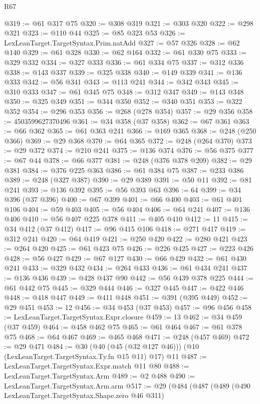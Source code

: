 \begin{lexlean}{R67}
\begin{coremodule}
@319 := @61 @317 @75
@320 := @308 @319
@321 := @303 @320
@322 := @298 @321
@323 := @110 @44
@325 := @85 @323 @53
@326 := LexLeanTarget.TargetSyntax.Prim.natAdd
@327 := @57 @326
@328 := @62 @140
@329 := @61 @328
@330 := @62 @164
@332 := @61 @330 @75
@333 := @329 @332
@334 := @327 @333
@336 := @61 @334 @75
@337 := @312 @336
@338 := @143 @337
@339 := @325 @338
@340 := @149 @339
@341 := @136 @333
@342 := @56 @341
@343 := @113 @241
@344 := @342 @343
@345 := @310 @333
@347 := @61 @345 @75
@348 := @312 @347
@349 := @143 @348
@350 := @325 @349
@351 := @344 @350
@352 := @340 @351
@353 := @322 @352
@354 := @296 @353
@356 := @268 (@278 @354)
@357 := @29 @356
@358 := 4503599627370496
@361 := @34 @358 (@37 @358)
@362 := @67 @361
@363 := @66 @362
@365 := @61 @363 @241
@366 := @169 @365
@368 := @248 (@250 @366)
@369 := @29 @368
@370 := @64 @365
@372 := @248 (@264 @370)
@373 := @29 @372
@374 := @210 @241
@375 := @136 @374
@376 := @56 @375
@377 := @67 @44
@378 := @66 @377
@381 := @248 (@376 @378 @209)
@382 := @29 @381
@384 := @376 @225 @363
@386 := @61 @384 @75
@387 := @233 @386
@389 := @248 (@327 @387)
@390 := @29 @389
@391 := @50 @11
@392 := @81 @241
@393 := @136 @392
@395 := @56 @393 @63
@396 := 64
@399 := @34 @396 (@37 @396)
@400 := @67 @399
@401 := @66 @400
@403 := @61 @401 @106
@404 := @59 @403
@405 := @56 @404
@406 := @64 @241
@407 := @136 @406
@410 := @56 @407 @225 @378
@411 := @405 @410
@412 := 11
@415 := @34 @412 (@37 @412)
@417 := @96 @415 @106
@418 := @271 @417
@419 := @312 @241
@420 := @64 @419
@421 := @250 @420
@422 := @280 @421
@423 := @264 @420
@425 := @61 @423 @75
@426 := @226 @425
@427 := @223 @426
@428 := @56 @427
@429 := @67 @127
@430 := @66 @429
@432 := @61 @430 @241
@433 := @329 @432
@434 := @264 @433
@436 := @61 @434 @241
@437 := @136 @436
@439 := @428 @437 @90
@442 := @56 @439 @378 @225
@444 := @61 @442 @75
@445 := @329 @444
@446 := @327 @445
@447 := @422 @446
@448 := @418 @447
@449 := @411 @448
@451 := @391 (@395 @449)
@452 := @29 @451
@453 := 12
@456 := @34 @453 (@37 @453)
@457 := @96 @456
@458 := LexLeanTarget.TargetSyntax.Expr.closure
@459 := 13
@462 := @34 @459 (@37 @459)
@464 := @458 @462 @75
@465 := @61 @464
@467 := @61 @378 @75
@468 := @64 @467
@469 := @465 @468
@471 := @248 (@457 @469)
@472 := @29 @471
@484 := @30 (@40 (@45 (@32 @127 @46))) (@10 (LexLeanTarget.TargetSyntax.Ty.fn @15 @11) @17) @11
@487 := LexLeanTarget.TargetSyntax.Expr.match @11 @80
@488 := LexLeanTarget.TargetSyntax.Arm
@489 := @2 @488
@490 := LexLeanTarget.TargetSyntax.Arm.arm
@517 := @29
    (@484
      (@487
        (@489
          (@490 LexLeanTarget.TargetSyntax.Shape.zero @46 @311)

\end{coremodule}
\end{lexlean}
